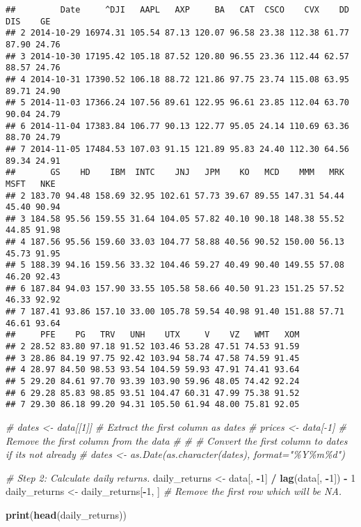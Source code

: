 \documentclass[
]{article}
\newenvironment{Shaded}{\begin{snugshade}}{\end{snugshade}}
\newcommand{\CommentTok}[1]{\textcolor[rgb]{0.56,0.35,0.01}{\textit{#1}}}
\newcommand{\DecValTok}[1]{\textcolor[rgb]{0.00,0.00,0.81}{#1}}
\newcommand{\FunctionTok}[1]{\textcolor[rgb]{0.13,0.29,0.53}{\textbf{#1}}}
\newcommand{\NormalTok}[1]{#1}
\newcommand{\OtherTok}[1]{\textcolor[rgb]{0.56,0.35,0.01}{#1}}
\newcommand{\SpecialCharTok}[1]{\textcolor[rgb]{0.81,0.36,0.00}{\textbf{#1}}}
\begin{document}
\begin{verbatim}
##         Date     ^DJI   AAPL   AXP     BA   CAT  CSCO    CVX    DD   DIS    GE
## 2 2014-10-29 16974.31 105.54 87.13 120.07 96.58 23.38 112.38 61.77 87.90 24.76
## 3 2014-10-30 17195.42 105.18 87.52 120.80 96.55 23.36 112.44 62.57 88.57 24.76
## 4 2014-10-31 17390.52 106.18 88.72 121.86 97.75 23.74 115.08 63.95 89.71 24.90
## 5 2014-11-03 17366.24 107.56 89.61 122.95 96.61 23.85 112.04 63.70 90.04 24.79
## 6 2014-11-04 17383.84 106.77 90.13 122.77 95.05 24.14 110.69 63.36 88.70 24.79
## 7 2014-11-05 17484.53 107.03 91.15 121.89 95.83 24.40 112.30 64.56 89.34 24.91
##       GS    HD    IBM  INTC    JNJ   JPM    KO   MCD    MMM   MRK  MSFT   NKE
## 2 183.70 94.48 158.69 32.95 102.61 57.73 39.67 89.55 147.31 54.44 45.40 90.94
## 3 184.58 95.56 159.55 31.64 104.05 57.82 40.10 90.18 148.38 55.52 44.85 91.98
## 4 187.56 95.56 159.60 33.03 104.77 58.88 40.56 90.52 150.00 56.13 45.73 91.95
## 5 188.39 94.16 159.56 33.32 104.46 59.27 40.49 90.40 149.55 57.08 46.20 92.43
## 6 187.84 94.03 157.90 33.55 105.58 58.66 40.50 91.23 151.25 57.52 46.33 92.92
## 7 187.41 93.86 157.10 33.00 105.78 59.54 40.98 91.40 151.88 57.71 46.61 93.64
##     PFE    PG   TRV   UNH    UTX     V    VZ   WMT   XOM
## 2 28.52 83.80 97.18 91.52 103.46 53.28 47.51 74.53 91.59
## 3 28.86 84.19 97.75 92.42 103.94 58.74 47.58 74.59 91.45
## 4 28.97 84.50 98.53 93.54 104.59 59.93 47.91 74.41 93.64
## 5 29.20 84.61 97.70 93.39 103.90 59.96 48.05 74.42 92.24
## 6 29.28 85.83 98.85 93.51 104.47 60.31 47.99 75.38 91.52
## 7 29.30 86.18 99.20 94.31 105.50 61.94 48.00 75.81 92.05
\end{verbatim}

\begin{Shaded}
\begin{Highlighting}[]
\CommentTok{\# dates \textless{}{-} data[[1]] \# Extract the first column as dates}
\CommentTok{\# prices \textless{}{-} data[{-}1] \# Remove the first column from the data}
\CommentTok{\# }
\CommentTok{\# \# Convert the first column to dates if it\textquotesingle{}s not already}
\CommentTok{\# dates \textless{}{-} as.Date(as.character(dates), format="\%Y\%m\%d")}

\CommentTok{\# Step 2: Calculate daily returns.}
\NormalTok{daily\_returns }\OtherTok{\textless{}{-}}\NormalTok{ data[, }\SpecialCharTok{{-}}\DecValTok{1}\NormalTok{] }\SpecialCharTok{/} \FunctionTok{lag}\NormalTok{(data[, }\SpecialCharTok{{-}}\DecValTok{1}\NormalTok{]) }\SpecialCharTok{{-}} \DecValTok{1}
\NormalTok{daily\_returns }\OtherTok{\textless{}{-}}\NormalTok{ daily\_returns[}\SpecialCharTok{{-}}\DecValTok{1}\NormalTok{, ]  }\CommentTok{\# Remove the first row which will be NA.}

\FunctionTok{print}\NormalTok{(}\FunctionTok{head}\NormalTok{(daily\_returns))}
\end{Highlighting}
\end{Shaded}
\end{document}
